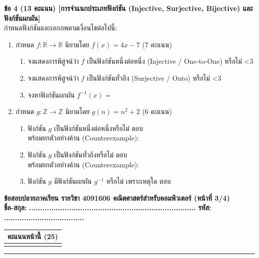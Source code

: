 \documentclass[a4paper,12pt]{article}
\newcounter{examline}
\newcommand{\examlines}[1]{%
  \setcounter{examline}{0}%
  \loop\ifnum\value{examline}<#1\relax
    \par\vspace{0.68em}\noindent\textcolor{gray!40}{\hrulefill}%
    \stepcounter{examline}%
  \repeat
}
\newcommand{\examheadpage}[3]{%
  \noindent
  \begin{minipage}[c]{0.75\textwidth}
    {\normalsize\bfseries\color{navy} ข้อสอบปลายภาคเรียน รายวิชา 4091606 คณิตศาสตร์สำหรับคอมพิวเตอร์ (หน้าที่ #3/4)}\\[0.15em]
    \textbf{ชื่อ-สกุล:} {\large\bfseries #1} \qquad \textbf{รหัส:} {\large\bfseries #2}
  \end{minipage}\hfill
  \begin{minipage}[c]{0.23\textwidth}
    \flushright
    \begin{tabular}{|m{2.0cm}|}
      \hline
      \centering\scriptsize\textbf{คะแนนหน้านี้ (25)} \tabularnewline
      \hline
      \vspace{0.45cm} \tabularnewline
      \hline
    \end{tabular}
  \end{minipage}
  \par\vspace{0.2em}\hrule\vspace{0.35em}
}
\begin{document}
\noindent\textbf{ข้อ 4 (13 คะแนน) [การจำแนกประเภทฟังก์ชัน (Injective, Surjective, Bijective) และฟังก์ชันผกผัน]} \\
กำหนดฟังก์ชันและเอกภพตามเงื่อนไขต่อไปนี้:
\begin{enumerate}[label=4.\arabic*), itemsep=5pt]
  \item กำหนด $f: \mathbb{R} \to \mathbb{R}$ นิยามโดย $f(x) = 4x - 7$ (7 คะแนน)
  \begin{enumerate}[label=(\alph*), itemsep=2.5pt]
    \item จงแสดงการพิสูจน์ว่า $f$ เป็นฟังก์ชันหนึ่งต่อหนึ่ง (Injective / One-to-One) หรือไม่
    \examlines{3}
    \item จงแสดงการพิสูจน์ว่า $f$ เป็นฟังก์ชันทั่วถึง (Surjective / Onto) หรือไม่
    \examlines{3}
    \item จงหาฟังก์ชันผกผัน $f^{-1}(x) =$ \makebox[8.5cm]{\dotfill}
  \end{enumerate}

  \item กำหนด $g: \mathbb{Z} \to \mathbb{Z}$ นิยามโดย $g(n) = n^2 + 2$ (6 คะแนน)
  \begin{enumerate}[label=(\alph*), itemsep=3pt]
    \item ฟังก์ชัน $g$ เป็นฟังก์ชันหนึ่งต่อหนึ่งหรือไม่ ตอบ \makebox[2.5cm]{\dotfill} \\
    พร้อมยกตัวอย่างค้าน (Counterexample): \makebox[9.5cm]{\dotfill}
    \item ฟังก์ชัน $g$ เป็นฟังก์ชันทั่วถึงหรือไม่ ตอบ \makebox[2.5cm]{\dotfill} \\
    พร้อมยกตัวอย่างค้าน (Counterexample): \makebox[9.5cm]{\dotfill}
    \item ฟังก์ชัน $g$ มีฟังก์ชันผกผัน $g^{-1}$ หรือไม่ เพราะเหตุใด ตอบ \makebox[7.5cm]{\dotfill}
  \end{enumerate}
\end{enumerate}

\clearpage

\examheadpage{...........................................................................}{....................................}{3}
\end{document}
